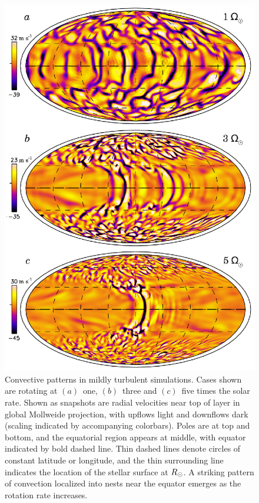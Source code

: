 \begin{figure}[htbp]
  \begin{center}
    \includegraphics[width=0.7\linewidth]{figs/chapter_3/Figure_2.eps}
  \end{center}
  \caption[Convective patterns in mildly turbulent
  simulations]{Convective patterns in mildly turbulent simulations.
  Cases shown are rotating at $(a)$~one, $(b)$~three and $(c)$~five
  times the solar rate.  Shown as snapshots are radial velocities near
  top of layer in global Mollweide projection, with upflows light and
  downflows dark (scaling indicated by accompanying colorbars). Poles are at top and bottom,
  and the equatorial region appears at middle, with equator indicated
  by bold dashed line. Thin dashed lines denote circles of constant
  latitude or longitude, and the thin surrounding line indicates the
  location of the stellar surface at $R_\odot$.  A striking pattern of 
  convection localized into nests near the equator emerges as the
  rotation rate increases. 
  \label{fig:ab2}}
\end{figure}


